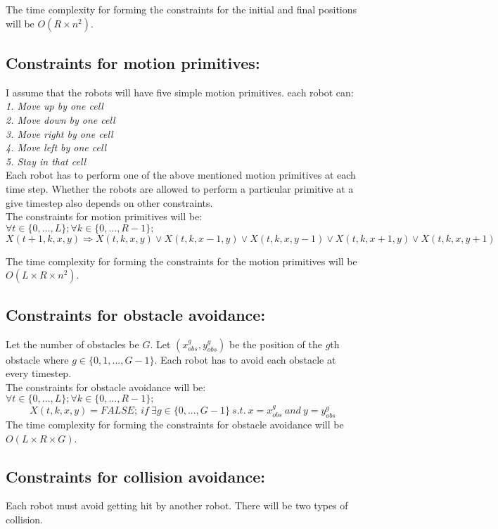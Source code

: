 \documentclass{article}[11pt]
\begin{document}
			The time complexity for forming the constraints for the initial and final positions will be $O(R \times n^2)$.			

		\subsection{Constraints for motion primitives:}
			I assume that the robots will have five simple motion primitives. each robot can:\\
			\textit{
				1. Move up by one cell\\
				2. Move down by one cell\\
				3. Move right by one cell\\
				4. Move left by one cell\\
				5. Stay in that cell\\ 
			}
			Each robot has to perform one of the above mentioned motion primitives at each time step. Whether the robots are allowed to perform a particular primitive at a give timestep also depends on other constraints.\\

			The constraints for motion primitives will be:\\
			$\forall{t \in \{0,...,L\}};\forall{k \in \{0,...,R-1\}};$
			$$
				X(t+1, k, x, y) \Rightarrow X(t,k,x,y)\vee X(t,k,x-1,y)\vee X(t,k,x,y-1)\vee X(t,k,x+1,y)\vee X(t,k,x,y+1)
			$$

			The time complexity for forming the constraints for the motion primitives will be $O(L \times R\times n^2)$.

		\subsection{Constraints for obstacle avoidance:}
			Let the number of obstacles be $G$. Let $(x_{obs}^g, y_{obs}^g)$ be the position of the $g$th obstacle where $g \in \{0, 1, . . . , G-1\}$. Each robot has to avoid each obstacle at every timestep.\\
			The constraints for obstacle avoidance will be:\\
			$\forall{t \in \{0,...,L\}};\forall{k \in \{0,...,R-1\}};$
			$$
				X(t, k, x, y) = FALSE;\ if\ \exists g \in \{0,...,G-1\}\ s.t.\ x=x_{obs}^g\ and\ y=y_{obs}^g
			$$
			The time complexity for forming the constraints for obstacle avoidance will be $O(L \times R\times G)$.

		\subsection{Constraints for collision avoidance:}
			Each robot must avoid getting hit by another robot. There will be two types of collision.
\end{document}
